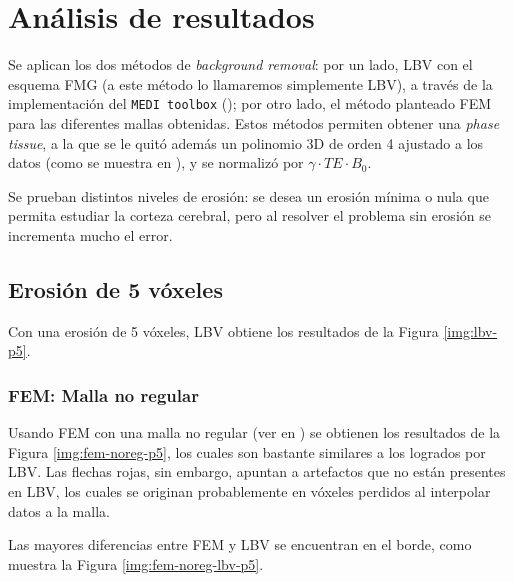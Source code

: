 
\newpage
\section{Análisis de resultados}

Se aplican los dos métodos de \textit{background removal}: por un lado, LBV con el esquema FMG (a este método lo llamaremos simplemente LBV), a través de la implementación del \texttt{MEDI toolbox} (\cite{lbv_fmg}); por otro lado, el método planteado FEM para las diferentes mallas obtenidas. Estos métodos permiten obtener una \textit{phase tissue}, a la que se le quitó además un polinomio 3D de orden 4 ajustado a los datos (como se muestra en \cite{challenge}), y se normalizó por $\gamma \cdot TE \cdot B_0$.

Se prueban distintos niveles de erosión: se desea un erosión mínima o nula que permita estudiar la corteza cerebral, pero al resolver el problema sin erosión se incrementa mucho el error. 

\subsection{Erosión de 5 vóxeles}

Con una erosión de 5 vóxeles, LBV obtiene los resultados de la Figura \ref{img:lbv-p5}.


\subsubsection{FEM: Malla no regular}

Usando FEM con una malla no regular (ver  en ) se obtienen los resultados de la Figura \ref{img:fem-noreg-p5}, los cuales son bastante similares a los logrados por LBV. Las flechas rojas, sin embargo, apuntan a artefactos que no están presentes en LBV, los cuales se originan probablemente en vóxeles perdidos al interpolar datos a la malla. 


Las mayores diferencias entre FEM y LBV se encuentran en el borde, como muestra la Figura \ref{img:fem-noreg-lbv-p5}.



